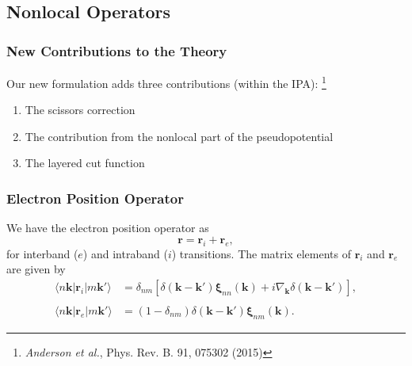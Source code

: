 \documentclass{beamer}
\begin{document}
\subsection{Nonlocal Operators}

\begin{frame}
\frametitle{New Contributions to the Theory}
Our new formulation adds three contributions (within the IPA):%
\footnote{\emph{Anderson et al.}, Phys. Rev. B. 91, 075302 (2015)}
\begin{enumerate}
\item The scissors correction
\item The contribution from the nonlocal part of the pseudopotential
\item The layered cut function
\end{enumerate}
\end{frame}

\begin{frame}
\frametitle{Electron Position Operator}
We have the electron position operator as 
\begin{equation*}
\mathbf{r} = \mathbf{r}_{i} + \mathbf{r}_{e},
\end{equation*}
for interband ($e$) and intraband ($i$) transitions. The matrix elements of $\mathbf{r}_{i}$ and $\mathbf{r}_{e}$ are given by
\begin{align*}
\langle n\mathbf{k}\vert \mathbf{r}_{i} |m\mathbf{k}'\rangle 
&= \delta_{nm}
\left[
  \delta(\mathbf{k} - \mathbf{k}')\boldsymbol{\xi}_{nn}(\mathbf{k})
+ i\nabla_{\mathbf{k}}\delta(\mathbf{k} - \mathbf{k}')
\right],\\\\
\langle n\mathbf{k}| \mathbf{r}_{e} |m\mathbf{k}'\rangle 
&= (1- \delta_{nm})\delta(\mathbf{k}-\mathbf{k}')
   \boldsymbol{\xi}_{nm}(\mathbf{k}).
\end{align*}
\end{frame}
\end{document}
